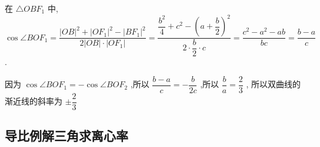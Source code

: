 \begin{enumerate}
\begin{jieda}
        在 ${\triangle OB}{F}_{1}$ 中, $\cos \angle {BO}{F}_{1} = \dfrac{{\left| OB\right| }^{2} + {\left| O{F}_{1}\right| }^{2} - {\left| B{F}_{1}\right| }^{2}}{2\left| {OB}\right|  \cdot  \left| {O{F}_{1}}\right| } = \dfrac{\dfrac{{b}^{2}}{4} + {c}^{2} - {\left( a + \dfrac{b}{2}\right) }^{2}}{2 \cdot  \dfrac{b}{2} \cdot  c} = \dfrac{{c}^{2} - {a}^{2} - {ab}}{bc} = \dfrac{b - a}{c}$ .
        
        因为 $\cos \angle {BO}{F}_{1} =  - \cos \angle {BO}{F}_{2}$ ,所以 $\dfrac{b - a}{c} =  - \dfrac{b}{2c}$ ,所以 $\dfrac{b}{a} = \dfrac{2}{3}$ ,
        所以双曲线的渐近线的斜率为 $\pm  \dfrac{2}{3}$
    \end{jieda}
\end{enumerate}
\subsection*{导比例解三角求离心率}
